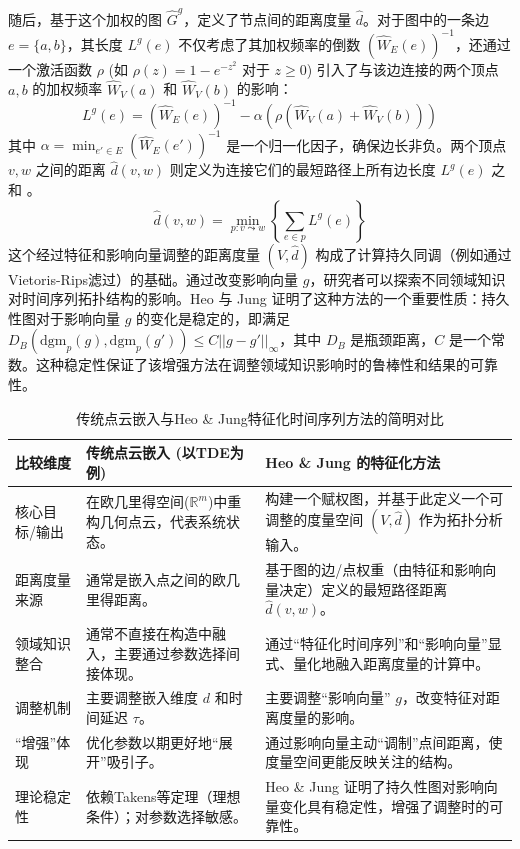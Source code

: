 随后，基于这个加权的图 $\hat{G}^g$，定义了节点间的距离度量 $\hat{d}$。对于图中的一条边 $e=\{a,b\}$，其长度 $L^g(e)$ 不仅考虑了其加权频率的倒数 $(\hat{W}_E(e))^{-1}$，还通过一个激活函数 $\rho$ (如 $\rho(z)=1-e^{-z^2}$ 对于 $z \ge 0$) 引入了与该边连接的两个顶点 $a,b$ 的加权频率 $\hat{W}_V(a)$ 和 $\hat{W}_V(b)$ 的影响：
\begin{equation}
\label{eq:featured_edge_length_revised}
L^g(e) = (\hat{W}_E(e))^{-1} - \alpha (\rho(\hat{W}_V(a) + \hat{W}_V(b)))
\end{equation}
其中 $\alpha = \min_{e' \in E} (\hat{W}_E(e'))^{-1}$ 是一个归一化因子，确保边长非负。两个顶点 $v,w$ 之间的距离 $\hat{d}(v,w)$ 则定义为连接它们的最短路径上所有边长度 $L^g(e)$ 之和 。
\begin{equation}
\label{eq:featured_distance_revised}
\hat{d}(v,w) = \min_{p: v \leadsto w} \left\{ \sum_{e \in p} L^g(e) \right\}
\end{equation}
这个经过特征和影响向量调整的距离度量 $(V, \hat{d})$ 构成了计算持久同调（例如通过Vietoris-Rips滤过）的基础。通过改变影响向量 $g$，研究者可以探索不同领域知识对时间序列拓扑结构的影响。Heo 与 Jung 证明了这种方法的一个重要性质：持久性图对于影响向量 $g$ 的变化是稳定的，即满足 $D_B(\text{dgm}_p(g), \text{dgm}_p(g')) \le C ||g-g'||_\infty$，其中 $D_B$ 是瓶颈距离，$C$ 是一个常数。这种稳定性保证了该增强方法在调整领域知识影响时的鲁棒性和结果的可靠性。
\begin{table}[htbp]
    \centering
    \caption{传统点云嵌入与Heo \& Jung特征化时间序列方法的简明对比}
    \label{tab:embedding_comparison_concise}
    \begin{tabular}{>{\raggedright\arraybackslash}p{} >{\raggedright\arraybackslash}p{} >{\raggedright\arraybackslash}p{}}
    \toprule
    \textbf{比较维度} & \textbf{传统点云嵌入 (以TDE为例)} & \textbf{Heo \& Jung 的特征化方法} \\
    \midrule
    核心目标/输出 &
    在欧几里得空间($\mathbb{R}^m$)中重构几何点云，代表系统状态。 &
    构建一个赋权图，并基于此定义一个可调整的度量空间 $(V, \hat{d})$ 作为拓扑分析输入。 \\
    \addlinespace
    距离度量来源 &
    通常是嵌入点之间的欧几里得距离。 &
    基于图的边/点权重（由特征和影响向量决定）定义的最短路径距离 $\hat{d}(v,w)$。 \\
    \addlinespace
    领域知识整合 &
    通常不直接在构造中融入，主要通过参数选择间接体现。 &
    通过“特征化时间序列”和“影响向量”显式、量化地融入距离度量的计算中。 \\
    \addlinespace
    调整机制 &
    主要调整嵌入维度 $d$ 和时间延迟 $\tau$。 &
    主要调整“影响向量” $g$，改变特征对距离度量的影响。 \\
    \addlinespace
    “增强”体现 &
    优化参数以期更好地“展开”吸引子。 &
    通过影响向量主动“调制”点间距离，使度量空间更能反映关注的结构。 \\
    \addlinespace
    理论稳定性 &
    依赖Takens等定理（理想条件）；对参数选择敏感。 &
    Heo \& Jung 证明了持久性图对影响向量变化具有稳定性，增强了调整时的可靠性。 \\
    \bottomrule
    \end{tabular}
    \end{table}
